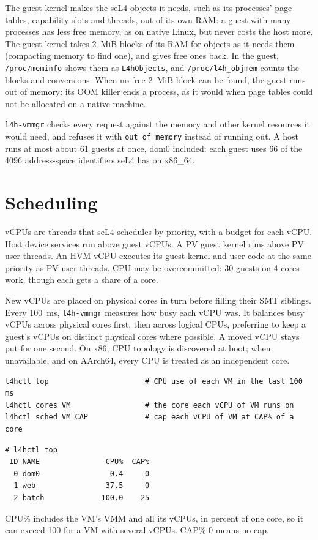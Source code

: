 \documentclass[11pt,a4paper]{report}
\newcommand{\file}[1]{\texttt{#1}}
\begin{document}
The guest kernel makes the seL4 objects it needs, such as its processes'
page tables, capability slots and threads, out of its own RAM: a guest
with many processes has less free memory, as on native Linux, but never
costs the host more. The guest kernel takes 2~MiB blocks of its RAM for
objects as it needs them (compacting memory to find one), and gives free
ones back. In the guest, \file{/proc/meminfo} shows them as
\texttt{L4hObjects}, and \file{/proc/l4h\_objmem} counts the blocks and
conversions. When no free 2~MiB block can be found, the guest runs out of
memory: its OOM killer ends a process, as it would when page tables could
not be allocated on a native machine.



\texttt{l4h-vmmgr} checks every request against the memory and other kernel
resources it would need, and refuses it with \texttt{out of memory} instead
of running out. A host runs at most about 61 guests at once, dom0 included:
each guest uses 66 of the 4096 address-space identifiers seL4 has on
x86\_64.

\section{Scheduling}

vCPUs are threads that seL4 schedules by priority, with a budget for each
vCPU. Host device services run above guest vCPUs. A PV guest kernel
runs above PV user threads. An HVM vCPU executes its guest kernel and
user code at the same priority as PV user threads. CPU may be overcommitted:
30 guests on 4 cores work, though each gets a share of a core.

New vCPUs are placed on physical cores in turn before filling their SMT
siblings. Every 100~ms, \texttt{l4h-vmmgr} measures how busy each vCPU was.
It balances busy vCPUs across physical cores first, then across logical
CPUs, preferring to keep a guest's vCPUs on distinct physical cores where
possible. A moved vCPU stays put for one second. On x86, CPU topology is
discovered at boot; when unavailable, and on AArch64, every CPU is treated
as an independent core.

\begin{lstlisting}
l4hctl top                      # CPU use of each VM in the last 100 ms
l4hctl cores VM                 # the core each vCPU of VM runs on
l4hctl sched VM CAP             # cap each vCPU of VM at CAP% of a core
\end{lstlisting}

\begin{lstlisting}
# l4hctl top
 ID NAME               CPU%  CAP%
  0 dom0                0.4     0
  1 web                37.5     0
  2 batch             100.0    25
\end{lstlisting}
CPU\% includes the VM's VMM and all its vCPUs, in percent of one core, so
it can exceed 100 for a VM with several vCPUs. CAP\% 0 means no cap.
\end{document}
